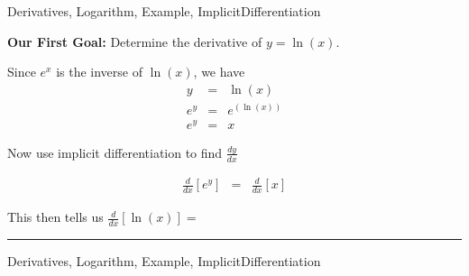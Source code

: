 	
\begin{tagblock}{Derivatives, Logarithm, Example, ImplicitDifferentiation}
\begin{question}
	


\textbf{Our First Goal:} Determine the derivative of $y = \ln(x)$.  
 
 Since $e^x$ is the inverse of $\ln(x)$, we have
 \begin{eqnarray*} y &=& \ln (x) \\
 e^y & = & e^(\ln (x)) \\
 e^y & = & x \end{eqnarray*}
 
 Now use implicit differentiation to find $\frac{dy}{dx}$
 
  \begin{eqnarray*} 
\frac{d}{dx}[ e^y ]& = & \frac{d}{dx}[x] \end{eqnarray*}
 
 \vspace{2in}
 
 This then tells us $\frac{d}{dx}[\ln(x)] = $ \rule[-0.1cm]{2.5cm}{0.01cm}

	
\begin{tags}
	   Derivatives, Logarithm, Example, ImplicitDifferentiation
\end{tags}
	
\begin{diary}
\end{diary}
	
\begin{solution}
	   
\end{solution}
	
\end{question}

\end{tagblock}


